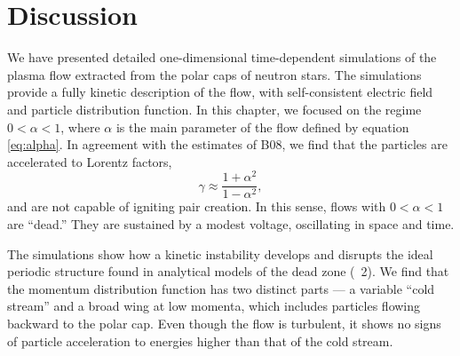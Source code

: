 


\section{Discussion}
\label{sec:pc-discussion}

We have presented detailed one-dimensional time-dependent simulations
of the plasma flow extracted from the polar caps of neutron stars.
The simulations provide a fully kinetic description of the flow,
with self-consistent electric field and particle distribution function.
In this chapter, we focused on the regime $0<\alpha<1$, where $\alpha$ is the main
parameter of the flow defined by equation \eqref{eq:alpha}.
In agreement with the estimates of B08, we find that
the particles are accelerated to Lorentz factors,
\begin{equation}
\label{eq:gam2}
   \gamma\approx \frac{1+\alpha^2}{1-\alpha^2},
 \end{equation}
and are not capable of igniting pair creation.
In this sense, flows with $0<\alpha<1$ are ``dead.''
They are sustained by a modest voltage, oscillating in space and time.

The simulations show how a kinetic instability develops and disrupts the ideal
periodic structure found in analytical models of the dead zone (\Sect~2).
We find that the momentum distribution function has two distinct parts --- a
variable ``cold stream'' and a broad wing at low momenta, which includes particles
flowing backward to the polar cap. Even though the flow is turbulent, it shows
no signs of particle acceleration to energies higher than that of the cold stream.


